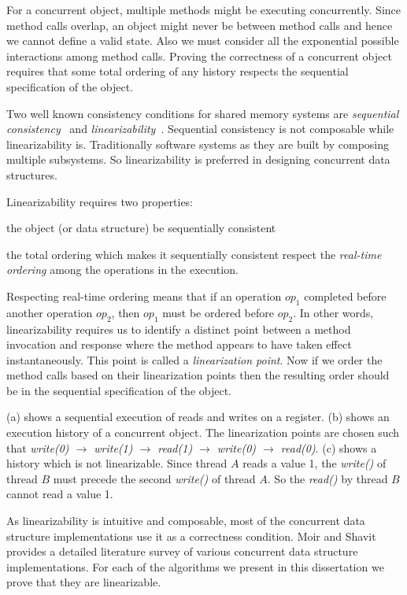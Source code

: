 For a concurrent object, multiple methods might be executing concurrently.
Since method calls overlap, an object might never be between method calls and hence we cannot define a valid state.
Also we must consider all the exponential possible interactions among method calls.
Proving the correctness of  a concurrent object requires that some total ordering of any history respects the sequential specification of the object.

Two well known consistency conditions for shared memory systems are \emph{sequential consistency}~\cite{Lamport:1979} and \emph{linearizability}~\cite{HerWin:1990:TOPLAS}.
Sequential consistency is not composable while linearizability is.
Traditionally software systems as they are built by composing multiple subsystems.
So linearizability is preferred in designing concurrent data structures.

Linearizability requires two properties:
\begin{enumerate*}[label=(\roman*)]
\item the object (or data structure) be sequentially consistent
\item the total ordering which makes it sequentially consistent respect the \emph{real-time ordering} among the operations in the execution.
\end{enumerate*}
Respecting real-time ordering means that if an operation $op_1$ completed before another operation $op_2$, then $op_1$ must be ordered before $op_2$.
In other words, linearizability  requires us to identify a distinct point between a method invocation and response where the method appears to have taken effect instantaneously.
This point is called a \emph{linearization point}.
Now if we order the method calls based on their linearization points then the resulting order should be in the sequential specification of the object.



(a) shows a sequential execution of reads and writes on a register.
(b) shows an execution history of a concurrent object.
The linearization points are chosen such that \textit{write(0) $\rightarrow$ write(1) $\rightarrow$ read(1) $\rightarrow$ write(0) $\rightarrow$ read(0)}.
(c) shows a history which is not linearizable.
Since thread $A$ reads a value 1, the \textit{write()} of thread $B$ must precede the second \textit{write()} of thread $A$.
So the \textit{read()} by thread $B$ cannot read a value 1.

As linearizability is intuitive and composable, most of the concurrent data structure implementations use it as a correctness condition.
Moir and Shavit~\cite{moirSha:2007} provides a detailed literature survey of various concurrent data structure implementations.
For each of the algorithms we present in this dissertation we prove that they are linearizable.